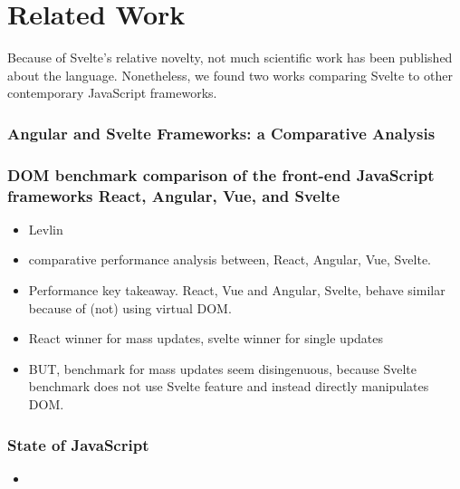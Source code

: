 \chapter{Related Work}

Because of Svelte's relative novelty, not much scientific work has been published about the language. Nonetheless, we found two works comparing Svelte to other contemporary JavaScript frameworks.

\subsection{Angular and Svelte Frameworks: a Comparative Analysis}

\subsection{DOM benchmark comparison of the front-end JavaScript frameworks React, Angular, Vue, and Svelte}

\begin{itemize}
    \item Levlin\cite{levlin_dom_2020}
    \item comparative performance analysis between, React, Angular, Vue, Svelte.
    \item Performance key takeaway. React, Vue and Angular, Svelte, behave similar because of (not) using virtual DOM.
    \item React winner for mass updates, svelte winner for single updates
    \item BUT, benchmark for mass updates seem disingenuous, because Svelte benchmark does not use Svelte feature and instead directly manipulates DOM. 
\end{itemize}

\subsection{State of JavaScript}

\begin{itemize}
    \item \cite{noauthor_state_nodate}
\end{itemize}